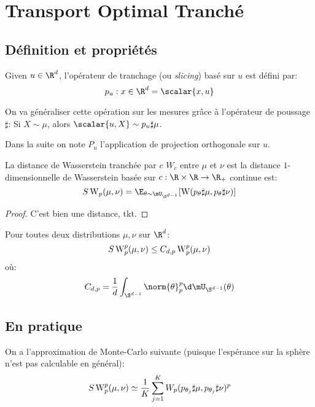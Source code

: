 \section{Transport Optimal Tranché}

\subsection{Définition et propriétés}

\begin{definition}
	Given $u \in \R^{d}$, l'opérateur de tranchage (ou \textit{slicing}) basé sur $u$ est défini par:
	\begin{equation*}
		p_{u}: x \in \R^{d} = \scalar{x, u}
	\end{equation*}
\end{definition}

On va généraliser cette opération sur les mesures grâce à l'opérateur de poussage $\sharp$:
Si $X \sim \mu$, alors $\scalar{u, X} \sim p_{u}\sharp \mu$.

Dans la suite on note $P_{u}$ l'application de projection orthogonale sur $u$.

\begin{definition}
	La distance de Wasserstein tranchée par $c$ $W_{c}$ entre $\mu$ et $\nu$ est la distance $1$-dimensionnelle de Wasserstein basée sur $c :\R \times \R \to \R_{+}$ continue est:
	\begin{equation*}
		S\Wass_{p}(\mu, \nu) = \E_{\theta \sim \mU_{\S^{d - 1}}}[\Wass(p_{\theta}\sharp \mu, p_{\theta}\sharp\nu)]
	\end{equation*}
\end{definition}
\begin{proof}
	C'est bien une distance, tkt.
\end{proof}

\begin{proposition}
	Pour toutes deux distributions $\mu, \nu$ sur $\R^{d}$:
	\begin{equation*}
		S\operatorname{W}_{p}^{p}(\mu, \nu) \leq C_{d, p}\operatorname{W}_{p}^{p}(\mu, \nu)
	\end{equation*}
	où:
	\begin{equation*}
		C_{d, p} = \frac{1}{d}\int_{\S^{d - 1}}\norm{\theta}_{p}^{p}\d\mU_{\S^{d - 1}}(\theta)
	\end{equation*}
\end{proposition}

\subsection{En pratique}
On a l'approximation de Monte-Carlo suivante (puisque l'espérance sur la sphère n'est pas calculable en général):
\begin{equation*}
	S\operatorname{W}_{p}^{p}(\mu, \nu) \simeq \frac{1}{K}\sum_{j = 1}^{K} W_{p}(p_{\theta_{j}}\sharp\mu, p_{\theta_{j}}\sharp\nu)^{p}
\end{equation*}

